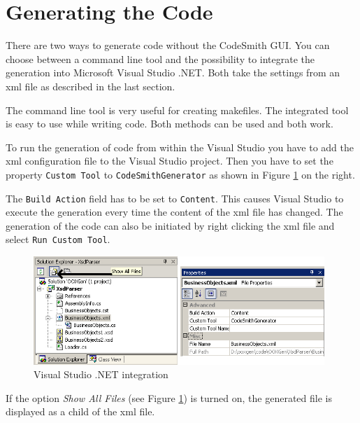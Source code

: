 	
	\section{Generating the Code}
	
		There are two ways to generate code without the CodeSmith GUI. You can choose between 
		a command line tool and the possibility to 
		integrate the generation into Microsoft Visual Studio .NET. Both take 
		the settings from an xml file as described in the last section.
		
		The command line tool is very useful for creating makefiles. The integrated
		tool is easy to use while writing code. Both methods can be used and both work.

		To run the generation of code from within the Visual Studio you have to add the xml 
		configuration file to the Visual Studio project. Then you have to set the 
		property \verb~Custom Tool~ to \verb~CodeSmithGenerator~ as shown in Figure 
		\ref{fig:vsdotnetCustomTool} on the right.
		
		The \verb~Build Action~ field has to be set to \verb~Content~. This causes Visual Studio 
		to execute the generation every time the content of the xml file has changed. The generation 
		of the code can also be initiated by right clicking the xml file and select 
		\verb~Run Custom Tool~.
		
		\begin{figure}[thb]
			\begin{center}
				\includegraphics[width=11cm]{./files/inc/figures/codesmithVsdotnet}
				\caption{\label{fig:vsdotnetCustomTool}Visual Studio .NET integration}
			\end{center}
		\end{figure}
		
		If the option \emph{Show All Files} (see Figure \ref{fig:vsdotnetCustomTool}) is 
		turned on, the generated file is displayed as a child of the xml file.
	

